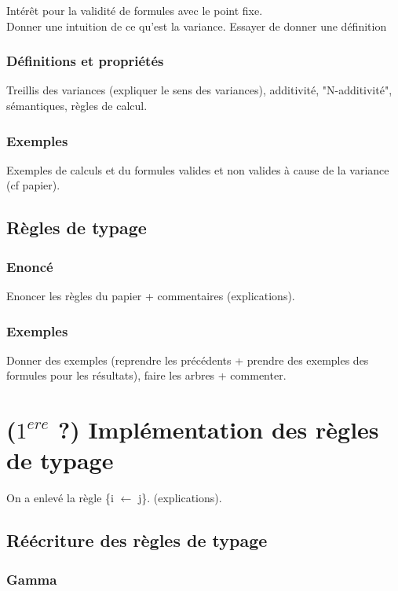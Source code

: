 \documentclass[11pt,a4paper]{article}
\begin{document}
Intérêt pour la validité de formules avec le point fixe. 
\\
Donner une intuition de ce qu'est la variance. Essayer de donner une définition

\subsubsection{Définitions et propriétés}

Treillis des variances (expliquer le sens des variances), additivité, "N-additivité", sémantiques, règles de calcul. 

\subsubsection{Exemples}

Exemples de calculs et du formules valides et non valides à cause de la variance (cf papier).

\subsection{Règles de typage}

\subsubsection{Enoncé}

Enoncer les règles du papier + commentaires (explications).


\subsubsection{Exemples}

Donner des exemples (reprendre les précédents + prendre des exemples des formules pour les résultats), faire les arbres + commenter.

\section{($1^{ere}$ ?) Implémentation des règles de typage}

On a enlevé la règle \{i $\longleftarrow$ j\}. (explications).

\subsection{Réécriture des règles de typage}

\subsubsection{Gamma}
\end{document}
